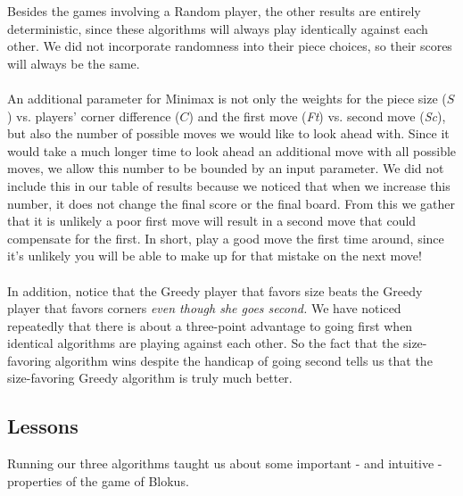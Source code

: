 \documentclass[11pt]{article}
\begin{document}
\noindent Besides the games involving a Random player, the other results are entirely deterministic, since these algorithms will always play identically against each other. We did not incorporate randomness into their piece choices, so their scores will always be the same.
\\\\
An additional parameter for Minimax is not only the weights for the piece size ($S$) vs. players' corner difference ($C$) and the first move ({\it Ft}) vs. second move ({\it Sc}), but also the number of possible moves we would like to look ahead with. Since it would take a much longer time to look ahead an additional move with all possible moves, we allow this number to be bounded by an input parameter. We did not include this in our table of results because we noticed that when we increase this number, it does not change the final score or the final board. From this we gather that it is unlikely a poor first move will result in a second move that could compensate for the first. In short, play a good move the first time around, since it's unlikely you will be able to make up for that mistake on the next move!
\\\\
In addition, notice that the Greedy player that favors size beats the Greedy player that favors corners {\it even though she goes second.} We have noticed repeatedly that there is about a three-point advantage to going first when identical algorithms are playing against each other. So the fact that the size-favoring algorithm wins despite the handicap of going second tells us that the size-favoring Greedy algorithm is truly much better.

\subsection{Lessons}

Running our three algorithms taught us about some important - and intuitive - properties of the game of Blokus.
\end{document}

